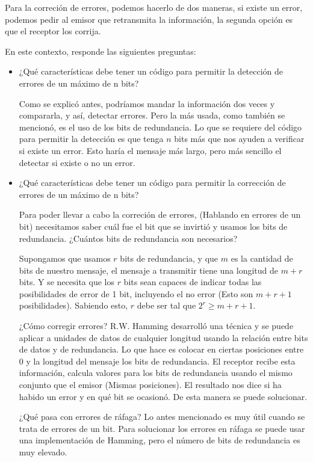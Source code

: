 \documentclass[spanish,12pt,letterpaper]{article}
\begin{document}
Para la correción de errores, podemos hacerlo de dos maneras, si existe un error,
podemos pedir al emisor que retransmita la información, la segunda opción es que
el receptor los corrija.

En este contexto, responde las siguientes preguntas:
\begin{itemize}
\item ¿Qué características debe tener un código para permitir la detección de
  errores de un máximo de n bits?

  Como se explicó antes, podríamos mandar la información dos veces y compararla,
  y así, detectar errores. Pero la más usada, como también se mencionó, es el uso
  de los bits de redundancia. Lo que se requiere del código para permitir la
  detección es que tenga $n$ bits más que nos ayuden a verificar si existe un
  error. Esto haría el mensaje más largo, pero más sencillo el detectar si existe
  o no un error.
  
\item ¿Qué características debe tener un código para permitir la corrección de
  errores de un máximo de n bits?

  Para poder llevar a cabo la correción de errores, (Hablando en errores de un
  bit) necesitamos saber cuál fue el bit que se invirtió y usamos los bits de
  redundancia. ¿Cuántos bits de redundancia son necesarios?

  Supongamos que usamos $r$ bits de redundancia, y que $m$ es la cantidad de bits
  de nuestro mensaje, el mensaje a transmitir tiene una longitud de $m+r$ bits. Y
  se necesita que los $r$ bits sean capaces de indicar todas las posibilidades de
  error de 1 bit, incluyendo el no error (Esto son $m+r+1$ posibilidades).
  Sabiendo esto, $r$ debe ser tal que $2^{r} \geq m+r+1$.

  ¿Cómo corregir errores? R.W. Hamming desarrolló una técnica y se puede aplicar
  a unidades de datos de cualquier longitud usando la relación entre bits de
  datos y de redundancia. Lo que hace es colocar en ciertas posiciones entre $0$
  y la longitud del mensaje los bits de redundancia. El receptor recibe esta
  información, calcula valores para los bits de redundancia usando el mismo
  conjunto que el emisor (Mismas posiciones). El resultado nos dice si ha habido
  un error y en qué bit se ocasionó. De esta manera se puede solucionar.

  ¿Qué pasa con errores de ráfaga? Lo antes mencionado es muy útil cuando se
  trata de errores de un bit. Para solucionar los errores en ráfaga se puede usar
  una implementación de Hamming, pero el número de bits de redundancia es muy
  elevado.
  

\end{itemize}
\end{document}
